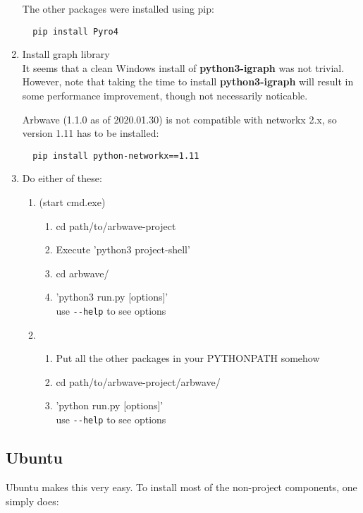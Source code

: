 \begin{enumerate}
  The other packages were installed using pip:
  \begin{verbatim}
  pip install Pyro4
  \end{verbatim}

  \item Install graph library \\
  It seems that a clean Windows install of \textbf{python3-igraph}
  was not trivial.  However, note that taking the time to install
  \textbf{python3-igraph} will result in some performance improvement, though
  not necessarily noticable.

  Arbwave (1.1.0 as of 2020.01.30) is not compatible with networkx 2.x, so
  version 1.11 has to be installed:
  \begin{verbatim}
  pip install python-networkx==1.11
  \end{verbatim}

  \item Do either of these:
    \begin{enumerate}
      \item  (start cmd.exe)
        \begin{enumerate}
          \item cd path/to/arbwave-project
          \item Execute 'python3 project-shell'
          \item cd arbwave/
          \item 'python3 run.py [options]'\\
            use \verb|--help| to see options
        \end{enumerate}
      \item
        \begin{enumerate}
          \item Put all the other packages in your PYTHONPATH somehow
          \item cd path/to/arbwave-project/arbwave/
          \item 'python run.py [options]'\\
            use \verb|--help| to see options
        \end{enumerate}
    \end{enumerate}
\end{enumerate}



\subsection{Ubuntu}
Ubuntu makes this very easy.  To install most of the non-project components, one
simply does:

